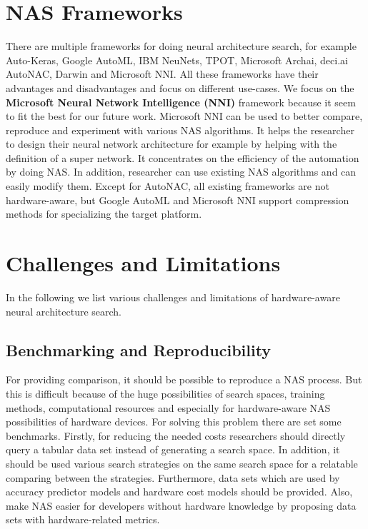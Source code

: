 \documentclass[conference]{IEEEtran}
\begin{document}
\section{NAS Frameworks}
\label{section:Frameworks}

There are multiple frameworks for doing neural architecture search, for example Auto-Keras, Google AutoML, IBM NeuNets, TPOT, Microsoft Archai, deci.ai AutoNAC, Darwin and Microsoft NNI. All these frameworks have their advantages and disadvantages and focus on different use-cases. We focus on the \textbf{Microsoft Neural Network Intelligence (NNI)} framework because it seem to fit the best for our future work. Microsoft NNI can be used to better compare, reproduce and experiment with various NAS algorithms. It helps the researcher to design their neural network architecture for example by helping with the definition of a super network. It concentrates on the efficiency of the automation by doing NAS. In addition, researcher can use existing NAS algorithms and can easily modify them. Except for AutoNAC, all existing frameworks are not hardware-aware, but Google AutoML and Microsoft NNI support compression methods for specializing the target platform. 

\section{Challenges and Limitations}
\label{section:Challenges}

In the following we list various challenges and limitations of hardware-aware neural architecture search. 

\subsection{Benchmarking and Reproducibility}

For providing comparison, it should be possible to reproduce a NAS process. But this is difficult because of the huge possibilities of search spaces, training methods, computational resources and especially for hardware-aware NAS possibilities of hardware devices. For solving this problem there are set some benchmarks. Firstly, for reducing the needed costs researchers should directly query a tabular data set instead of generating a search space. In addition, it should be used various search strategies on the same search space for a relatable comparing between the strategies. Furthermore, data sets which are used by accuracy predictor models and hardware cost models should be provided. Also, make NAS easier for developers without hardware knowledge by proposing data sets with hardware-related metrics.
\end{document}
